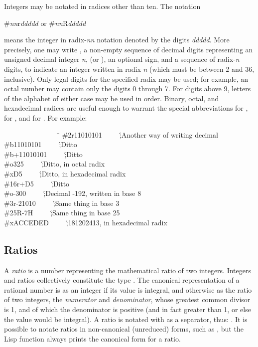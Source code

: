 Integers may be notated in radices other than ten.
The notation
\begin{lisp}
\#\emph{nn}r\emph{ddddd}     \textrm{or}     \#\emph{nn}R\emph{ddddd}
\end{lisp}
means the integer in radix-\emph{nn} notation denoted by the digits
\emph{ddddd}.  More precisely, one may write \cd{\#}, a non-empty sequence
of decimal digits representing an unsigned decimal integer \emph{n},
 (or ), an optional sign, and a sequence of radix-\emph{n}
digits, to indicate an integer written in radix \emph{n} (which must be
between 2 and 36, inclusive).  Only legal digits
for the specified radix may be used; for example, an octal number may
contain only the digits 0 through 7.  For digits above 9,
letters of the alphabet of either
case may be used in order.  Binary, octal, and
hexadecimal radices are useful enough to warrant the special
abbreviations  for ,  for , and
 for .
For example:
\begin{lisp}
~~~~~~~~~~~~~~~~\=\kill
\>\#2r11010101~~~~~\';\textrm{Another way of writing  decimal} \\
\>\#b11010101~~~~~\';\textrm{Ditto} \\
\>\#b+11010101~~~~~\';\textrm{Ditto} \\
\>\#o325~~~~~\';\textrm{Ditto, in octal radix} \\
\>\#xD5~~~~~\';\textrm{Ditto, in hexadecimal radix} \\
\>\#16r+D5~~~~~\';\textrm{Ditto} \\
\>\#o-300~~~~~\';\textrm{Decimal -192, written in base 8} \\
\>\#3r-21010~~~~~\';\textrm{Same thing in base 3} \\
\>\#25R-7H~~~~~\';\textrm{Same thing in base 25} \\
\>\#xACCEDED~~~~~\';\textrm{181202413, in hexadecimal radix}
\end{lisp}

\subsection{Ratios}

A \emph{ratio} is a number representing the mathematical ratio
of two integers.  Integers and ratios collectively constitute
the type .
The canonical representation of a rational number is as an
integer if its value is integral, and otherwise as the ratio of two
integers, the \emph{numerator} and \emph{denominator}, whose greatest
common divisor is 1, and of which the denominator is positive (and in
fact greater than 1, or else the value would be integral).
A ratio is notated with
\cdf{/} as a separator, thus: .  It is possible to notate
ratios in non-canonical (unreduced) forms, such as , but the
Lisp function  always prints the canonical form for a
ratio.

